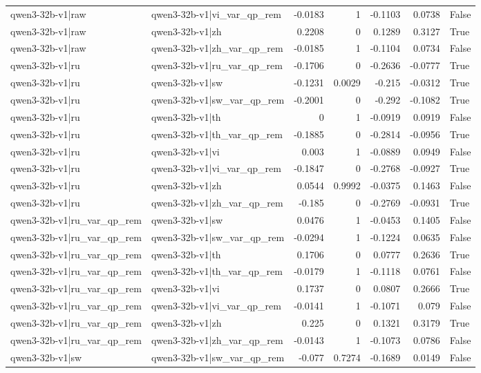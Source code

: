 \begin{table}
\begin{tabular}{l l r r r r l}
qwen3-32b-v1|raw & qwen3-32b-v1|vi_var_qp_rem & -0.0183 & 1 & -0.1103 & 0.0738 & False \\
qwen3-32b-v1|raw & qwen3-32b-v1|zh & 0.2208 & 0 & 0.1289 & 0.3127 & True \\
qwen3-32b-v1|raw & qwen3-32b-v1|zh_var_qp_rem & -0.0185 & 1 & -0.1104 & 0.0734 & False \\
qwen3-32b-v1|ru & qwen3-32b-v1|ru_var_qp_rem & -0.1706 & 0 & -0.2636 & -0.0777 & True \\
qwen3-32b-v1|ru & qwen3-32b-v1|sw & -0.1231 & 0.0029 & -0.215 & -0.0312 & True \\
qwen3-32b-v1|ru & qwen3-32b-v1|sw_var_qp_rem & -0.2001 & 0 & -0.292 & -0.1082 & True \\
qwen3-32b-v1|ru & qwen3-32b-v1|th & 0 & 1 & -0.0919 & 0.0919 & False \\
qwen3-32b-v1|ru & qwen3-32b-v1|th_var_qp_rem & -0.1885 & 0 & -0.2814 & -0.0956 & True \\
qwen3-32b-v1|ru & qwen3-32b-v1|vi & 0.003 & 1 & -0.0889 & 0.0949 & False \\
qwen3-32b-v1|ru & qwen3-32b-v1|vi_var_qp_rem & -0.1847 & 0 & -0.2768 & -0.0927 & True \\
qwen3-32b-v1|ru & qwen3-32b-v1|zh & 0.0544 & 0.9992 & -0.0375 & 0.1463 & False \\
qwen3-32b-v1|ru & qwen3-32b-v1|zh_var_qp_rem & -0.185 & 0 & -0.2769 & -0.0931 & True \\
qwen3-32b-v1|ru_var_qp_rem & qwen3-32b-v1|sw & 0.0476 & 1 & -0.0453 & 0.1405 & False \\
qwen3-32b-v1|ru_var_qp_rem & qwen3-32b-v1|sw_var_qp_rem & -0.0294 & 1 & -0.1224 & 0.0635 & False \\
qwen3-32b-v1|ru_var_qp_rem & qwen3-32b-v1|th & 0.1706 & 0 & 0.0777 & 0.2636 & True \\
qwen3-32b-v1|ru_var_qp_rem & qwen3-32b-v1|th_var_qp_rem & -0.0179 & 1 & -0.1118 & 0.0761 & False \\
qwen3-32b-v1|ru_var_qp_rem & qwen3-32b-v1|vi & 0.1737 & 0 & 0.0807 & 0.2666 & True \\
qwen3-32b-v1|ru_var_qp_rem & qwen3-32b-v1|vi_var_qp_rem & -0.0141 & 1 & -0.1071 & 0.079 & False \\
qwen3-32b-v1|ru_var_qp_rem & qwen3-32b-v1|zh & 0.225 & 0 & 0.1321 & 0.3179 & True \\
qwen3-32b-v1|ru_var_qp_rem & qwen3-32b-v1|zh_var_qp_rem & -0.0143 & 1 & -0.1073 & 0.0786 & False \\
qwen3-32b-v1|sw & qwen3-32b-v1|sw_var_qp_rem & -0.077 & 0.7274 & -0.1689 & 0.0149 & False \\

\end{tabular}
\end{table}
